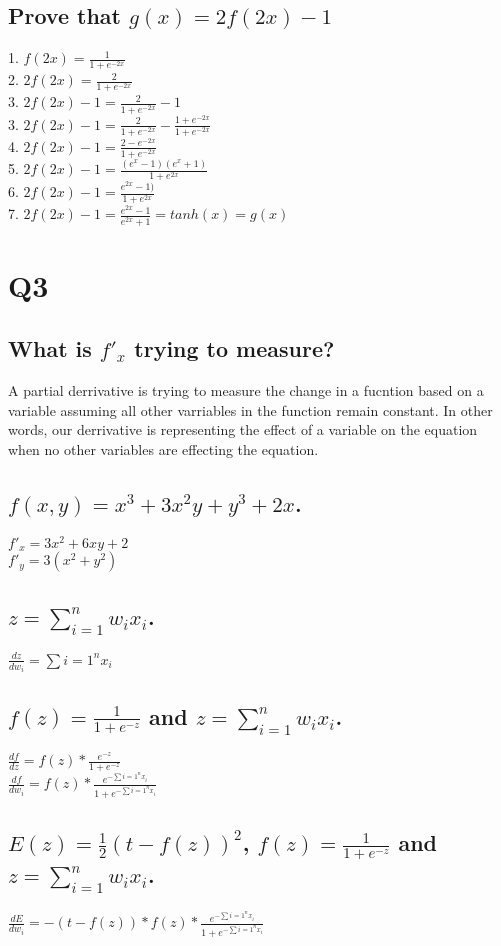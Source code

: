 \documentclass[11pt]{article}
\begin{document}
\subsection{Prove that $g(x) = 2f(2x)-1$}
1. $f(2x) = \frac{1}{1+e^{-2x}}$ \\
2. $2f(2x) =\frac{2}{1+e^{-2x}}$ \\
3. $2f(2x) - 1 = \frac{2}{1+e^{-2x}}  -1$ \\
3. $2f(2x) - 1 = \frac{2}{1+e^{-2x}}  - \frac{1+e^{-2x}}{1+e^{-2x}}$ \\
4. $2f(2x) - 1 = \frac{2- e^{-2x}}{1+e^{-2x}}$ \\
5. $2f(2x) - 1 = \frac{(e^{x}-1)(e^{x}+1)}{1+e^{2x}}$ \\
6. $2f(2x) - 1 = \frac{e^{2x}-1)}{1+e^{2x}}$ \\
7.  $2f(2x) - 1  = \frac{e^{2x}-1}{e^{2x}+1} = tanh(x) = g(x)$  \\
\section{Q3}   
\subsection{What is $f'_x$ trying to measure?}
A partial derrivative is trying to measure the change in a fucntion based on a variable assuming all other varriables in the function remain constant. In other words, our derrivative is representing the effect of a variable on the equation when no other variables are effecting the equation.
\subsection{$f(x,y)=x^3 + 3x^2y+y^3 + 2x$.}
$f'_x = 3x^2 + 6xy+2 $  \\ $f'_y = 3(x^2+y^2)$
\subsection{ $z = \sum_{i=1}^n w_i x_i$.}
$\frac{dz}{dw_i}= \sum{i=1}^n x_i $
\subsection{$f(z)=\frac{1}{1+e^{-z}}$ and $z = \sum_{i=1}^n w_i x_i$.}
$\frac{df}{dz}= f(z)* \frac{e^{-z}}{1 + e^{-z}} $ \\
$\frac{df}{dw_i}=f(z)*\frac{e^{- \sum{i=1}^n x_i }}{1+e^{- \sum{i=1}^n x_i }}$ \\
\subsection{$E(z)=\frac{1}{2}(t - f(z))^2$, $f(z)=\frac{1}{1+e^{-z}}$ and $z = \sum_{i=1}^n w_i x_i$.}
$\frac{dE}{dw_i} = -(t-f(z))*f(z)*\frac{e^{- \sum{i=1}^n x_i }}{1+e^{- \sum{i=1}^n x_i }}$
\end{document}

